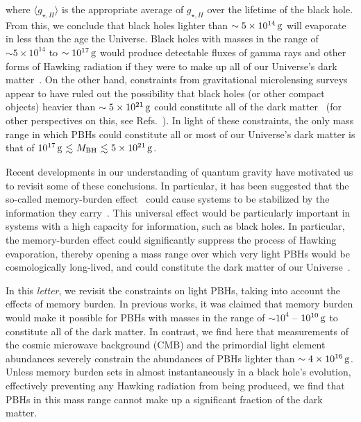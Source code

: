 \documentclass[aps, prl, reprint, preprintnumbers, showpacs, floatfix, nofootinbib, superscriptaddress, %
nofootinbib]{revtex4-1}
\newcommand{\lsim}{\raisebox{-0.13cm}{~\shortstack{$<$ \\[-0.07cm]
      $\sim$}}~}
\begin{document}
where $\langle g_{\star, H} \rangle$ is the appropriate average of $g_{\star, H}$ over the lifetime of the black hole. From this, we conclude that black holes lighter than $\sim 5 \times 10^{14}\,{\rm g}$ will evaporate in less than the age the Universe. Black holes with masses in the range of $\sim 5 \times 10^{14}$ to $\sim 10^{17}\,{\rm g}$ would produce detectable fluxes of gamma rays and other forms of Hawking radiation if they were to make up all of our Universe's dark matter~\cite{Coogan:2020tuf, Boudaud:2018hqb, PhysRevD.101.123514, Keith:2021guq, Dasgupta:2019cae}. On the other hand, constraints from gravitational microlensing surveys appear to have ruled out the possibility that black holes (or other compact objects) heavier than $\sim 5 \times 10^{21}\,{\rm g}$ could constitute all of the dark matter~\cite{Macho:2000nvd, EROS-2:2006ryy, Griest:2013aaa, Oguri:2017ock, Niikura:2019kqi, Croon:2020ouk} (for other perspectives on this, see Refs.~\cite{Carr:2023tpt,Garcia-Bellido:2024yaz}). In light of these constraints, the only mass range in which PBHs could constitute all or most of our Universe's dark matter is that of $10^{17}\,{\rm g} \lsim M_{\rm BH} \lsim 5 \times 10^{21}\,{\rm g}$.

Recent developments in our understanding of quantum gravity have motivated us to revisit some of these conclusions. In particular, it has been suggested that the so-called memory-burden effect~\cite{Dvali:2018xpy, Dvali:2018ytn} could cause systems to be stabilized by the information they carry~\cite{Dvali:2020wft}. This universal effect would be particularly important in systems with a high capacity for information, such as black holes. In particular, the memory-burden effect could significantly suppress the process of Hawking evaporation, thereby opening a mass range over which very light PBHs would be cosmologically long-lived, and could constitute the dark matter of our Universe~\cite{Dvali:2020wft, Alexandre:2024nuo, Dvali:2024hsb, Thoss:2024hsr}.

In this \textit{letter}, we revisit the constraints on light PBHs, taking into account the effects of memory burden. In previous works, it was claimed that memory burden would make it possible for PBHs with masses in the range of $\sim 10^{4}$ -- $10^{10}\,{\rm g}$ to constitute all of the dark matter. In contrast, we find here that measurements of the cosmic microwave background (CMB) and the primordial light element abundances severely constrain the abundances of PBHs lighter than $\sim 4 \times 10^{16}\,{\rm g}$. Unless memory burden sets in almost instantaneously in a black hole's evolution, effectively preventing any Hawking radiation from being produced, we find that PBHs in this mass range cannot make up a significant fraction of the dark matter.
\vspace{1mm}
\end{document}
